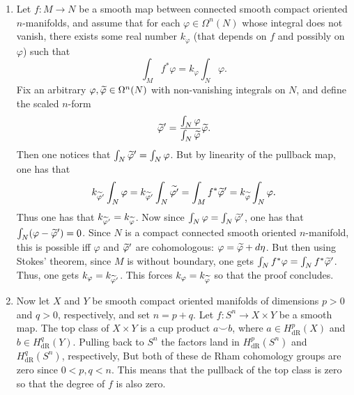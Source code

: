 \documentclass{article}
\begin{document}
	\begin{enumerate}[itemsep =-2pt,label = (\alph{*})]
		\item Let $f: M \to N$ be a smooth map between connected smooth compact oriented $n$-manifolds, and assume that for each $\varphi \in \Omega^{n}(N)$ whose integral does not vanish, there exists some real number $k_{\varphi}$ (that depends on $f$ and possibly on $\varphi$) such that 
			\begin{equation*}
				\int_{M}f^{\ast}\varphi = k_{\varphi} \int_{N}\varphi. 
			\end{equation*}
		Fix an arbitrary $\varphi, \widetilde{\varphi} \in \Omega^{n}(N)$ with non-vanishing integrals on $N$, and define the scaled $n$-form 
		\begin{equation*}
			\widetilde{\varphi}' = \frac{\int_{N}\varphi}{\int_{N}\widetilde{\varphi}}\widetilde{\varphi}. 
		\end{equation*}
		Then one notices that $\int_{N}\widetilde{\varphi}' = \int_{N}\varphi$. But by linearity of the pullback map, one has that 
		\begin{equation*}
			k_{\widetilde{\varphi}'}\int_{N}\varphi = k_{\widetilde{\varphi}'}\int_{N}\widetilde{\varphi'} = \int_{M}f^{\ast}\widetilde{\varphi}' = k_{\widetilde{\varphi}}\int_{N}\varphi. 
		\end{equation*}
		Thus one has that $k_{\widetilde{\varphi}'} = k_{\widetilde{\varphi}}$. Now since $\int_{N}\varphi = \int_{N}\widetilde{\varphi}'$, one has that $\int_{N}(\varphi - \widetilde{\varphi}') = 0$. Since $N$ is a compact connected smooth oriented $n$-manifold, this is possible iff $\varphi$ and $\widetilde{\varphi}'$ are cohomologous: $\varphi = \widetilde{\varphi} + d\eta$. But then using Stokes' theorem, since $M$ is without boundary, one gets $\int_{N}f^{\ast}\varphi = \int_{N}f^{\ast}\widetilde{\varphi}'$. Thus, one gets $k_{\varphi} = k_{\widetilde{\varphi}'}$. This forces $k_{\varphi} = k_{\widetilde{\varphi}}$ so that the proof concludes. 
		\item Now let $X$ and $Y$ be smooth compact oriented manifolds of dimensions $p > 0$ and $q > 0$, respectively, and set $n = p + q$. Let $f: S^{n} \to  X \times Y$ be a smooth map. The top class of $X \times Y$ is a cup product $a \smile b$, where $a \in H^p_{\text{dR}}(X)$ and $b \in H^q_{\text{dR}}(Y)$. Pulling back to $S^n$ the factors land in $H^{p}_{\text{dR}}(S^n)$ and $H^{q}_{\text{dR}}(S^n)$, respectively, But both of these de Rham cohomology groups are zero since $0 < p, q < n$. This means that the pullback of the top class is zero so that the degree of $f$ is also zero. 
	\end{enumerate}
	
\end{document}
